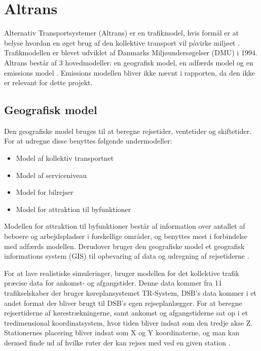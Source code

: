 \section{Altrans}
Alternativ Transportsystemer (Altrans) er en trafikmodel, hvis formål er at belyse hvordan en øget brug af den kollektive transport vil påvirke miljøet \cite[s. 14]{dmumodelanalyser}. Trafikmodellen er blevet udviklet af Danmarks Miljøundersøgelser (DMU) i 1994. Altrans består af 3 hovedmodeller: en geografisk model, en adfærds model og en emissions model \cite[s. 14]{dmuadfaerdsmodel}. Emissions modellen bliver ikke nævnt i rapporten, da den ikke er relevant for dette projekt.
\subsection*{Geografisk model}
Den geografiske model bruges til at beregne rejsetider, ventetider og skiftetider. For at udregne disse benyttes følgende undermodeller:

\begin{itemize}
\item Model af kollektiv transportnet
\item Model af serviceniveau
\item Model for bilrejser
\item Model for attraktion til byfunktioner
\end{itemize}

Modellen for attraktion til byfunktioner består af information over antallet af beboere og arbejdspladser i forskellige områder, og benyttes mest i forbindelse med adfærds modellen. Derudover bruger den geografiske model et geografisk informations system (GIS) til opbevaring af data og udregning af rejsetiderne \cite[s. 18-19]{dmumodelanalyser}.

\vspace{5mm}

For at lave realistiske simuleringer, bruger modellen for det kollektive trafik præcise data for ankomst- og afgangstider. Denne data kommer fra 11 trafikselskaber der bruger køreplansystemet TR-System, DSB’s data kommer i et andet format der bliver brugt til DSB’s egen rejseplanlægger. For at beregne rejsertiderne af kørestrækningerne, samt ankomst og afgangstiderne sat op i et tredimensional koordinatsystem, hvor tiden bliver indsat som den tredje akse Z. Stationernes placering bliver indsat som X og Y koordinaterne, og man kan dermed finde ud af hvilke ruter der kan rejses med ved en given station \cite[s. 20-22]{dmumodelanalyser}.

